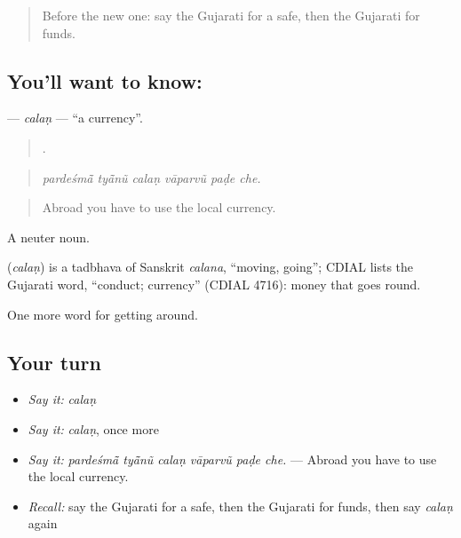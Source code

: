 \label{lesson:GU-C429-calan}



\begin{quote}
Before the new one: say the Gujarati for a safe, then the Gujarati for funds.
\end{quote}

\subsection*{You'll want to know: }
\textbf{} — \emph{calaṇ} — \textquotedblleft{}a currency\textquotedblright{}.

\begin{quote}
     .
\end{quote}

\begin{quote}
\emph{pardeśmā̃ tyā̃nũ calaṇ vāparvũ paḍe che.}
\end{quote}

\begin{quote}
Abroad you have to use the local currency.
\end{quote}

A neuter noun.

\begin{cousinweb}
\textbf{} (\emph{calaṇ}) is a tadbhava of Sanskrit \emph{calana}, \textquotedblleft{}moving, going\textquotedblright{}; CDIAL lists the Gujarati word, \textquotedblleft{}conduct; currency\textquotedblright{} (CDIAL 4716): money that goes round.
\end{cousinweb}

\begin{grammarlens}[title={What you've built}]
One more word for getting around.
\end{grammarlens}

\subsection*{Your turn}
\begin{itemize}
\raggedright
  \item \emph{Say it:} \emph{calaṇ}
  \item \emph{Say it:} \emph{calaṇ}, once more
  \item \emph{Say it:} \emph{pardeśmā̃ tyā̃nũ calaṇ vāparvũ paḍe che.} — Abroad you have to use the local currency.
  \item \emph{Recall:} say the Gujarati for a safe, then the Gujarati for funds, then say \emph{calaṇ} again
\end{itemize}

